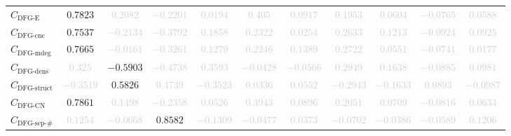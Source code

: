 \documentclass{standalone}
\newcommand{\dfgedgesname}{\text{DFG-E}}
\newcommand{\dfgedges}{C_{\dfgedgesname}}
\newcommand{\dfgcncname}{\text{DFG-cnc}}
\newcommand{\dfgcnc}{C_{\dfgcncname}}
\newcommand{\dfgmaxdegname}{\text{DFG-mdeg}}
\newcommand{\dfgmaxdeg}{C_{\dfgmaxdegname}}
\newcommand{\dfgdensname}{\text{DFG-dens}}
\newcommand{\dfgdens}{C_{\dfgdensname}}
\newcommand{\dfgstructname}{\text{DFG-struct}}
\newcommand{\dfgstruct}{C_{\dfgstructname}}
\newcommand{\dfgcycnumbername}{\text{DFG-CN}}
\newcommand{\dfgcycnumber}{C_{\dfgcycnumbername}}
\newcommand{\dfgsepnumname}{\text{DFG-sep-\#}}
\newcommand{\dfgsepnum}{C_{\dfgsepnumname}}
\begin{document}
\begin{tabular}{lcccccccccc}
$\dfgedges$ & $0.7823$ & \textcolor{lightgray}{$0.2082$} & \textcolor{lightgray}{$-0.2201$} & \textcolor{lightgray}{$0.0194$} & \textcolor{lightgray}{$0.405$} & \textcolor{lightgray}{$0.0917$} & \textcolor{lightgray}{$0.1953$} & \textcolor{lightgray}{$0.0604$} & \textcolor{lightgray}{$-0.0765$} & \textcolor{lightgray}{$0.0588$} \\ 
$\dfgcnc$ & $0.7537$ & \textcolor{lightgray}{$-0.2134$} & \textcolor{lightgray}{$-0.3792$} & \textcolor{lightgray}{$0.1858$} & \textcolor{lightgray}{$0.2322$} & \textcolor{lightgray}{$0.0254$} & \textcolor{lightgray}{$0.2633$} & \textcolor{lightgray}{$0.1213$} & \textcolor{lightgray}{$-0.0924$} & \textcolor{lightgray}{$0.0925$} \\ 
$\dfgmaxdeg$ & $0.7665$ & \textcolor{lightgray}{$-0.0161$} & \textcolor{lightgray}{$-0.3261$} & \textcolor{lightgray}{$0.1279$} & \textcolor{lightgray}{$0.2246$} & \textcolor{lightgray}{$0.1389$} & \textcolor{lightgray}{$0.2722$} & \textcolor{lightgray}{$0.0551$} & \textcolor{lightgray}{$-0.0741$} & \textcolor{lightgray}{$0.0177$} \\ 
$\dfgdens$ & \textcolor{lightgray}{$0.325$} & $-0.5903$ & \textcolor{lightgray}{$-0.4738$} & \textcolor{lightgray}{$0.3593$} & \textcolor{lightgray}{$-0.0428$} & \textcolor{lightgray}{$-0.0566$} & \textcolor{lightgray}{$0.2949$} & \textcolor{lightgray}{$0.1638$} & \textcolor{lightgray}{$-0.0885$} & \textcolor{lightgray}{$0.0981$} \\ 
$\dfgstruct$ & \textcolor{lightgray}{$-0.3519$} & $0.5826$ & \textcolor{lightgray}{$0.4739$} & \textcolor{lightgray}{$-0.3523$} & \textcolor{lightgray}{$0.0336$} & \textcolor{lightgray}{$0.0552$} & \textcolor{lightgray}{$-0.2943$} & \textcolor{lightgray}{$-0.1633$} & \textcolor{lightgray}{$0.0893$} & \textcolor{lightgray}{$-0.0987$} \\ 
$\dfgcycnumber$ & $0.7861$ & \textcolor{lightgray}{$0.1498$} & \textcolor{lightgray}{$-0.2358$} & \textcolor{lightgray}{$0.0526$} & \textcolor{lightgray}{$0.3943$} & \textcolor{lightgray}{$0.0896$} & \textcolor{lightgray}{$0.2051$} & \textcolor{lightgray}{$0.0709$} & \textcolor{lightgray}{$-0.0816$} & \textcolor{lightgray}{$0.0634$} \\ 
$\dfgsepnum$ & \textcolor{lightgray}{$0.1254$} & \textcolor{lightgray}{$-0.0668$} & $0.8582$ & \textcolor{lightgray}{$-0.1309$} & \textcolor{lightgray}{$-0.0477$} & \textcolor{lightgray}{$0.0373$} & \textcolor{lightgray}{$-0.0702$} & \textcolor{lightgray}{$-0.0386$} & \textcolor{lightgray}{$-0.0589$} & \textcolor{lightgray}{$0.1206$} \\ 

\end{tabular}
\end{document}
